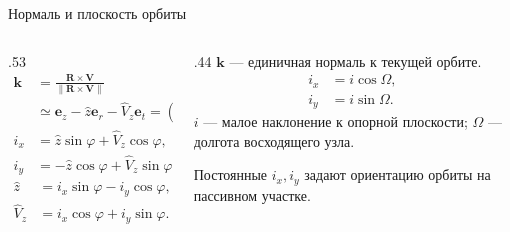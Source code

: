 \documentclass[11pt,aspectratio=169,t]{beamer}
\newcommand{\eqcompact}{\fontsize{10}{12}\selectfont}
\newcommand{\vz}{\widehat V_z}
\newcommand{\zh}{\widehat z}
\begin{document}
\begin{frame}{Нормаль и плоскость орбиты}
\relax
\begin{columns}[T,onlytextwidth]
\begin{column}{.53\textwidth}
{\eqcompact\derivationmathspacing
\[
\begin{aligned}
 \boldsymbol k&=\frac{\boldsymbol R\times\boldsymbol V}
                         {\|\boldsymbol R\times\boldsymbol V\|}\\[4pt]
 &\simeq\boldsymbol e_z-\zh\boldsymbol e_r-\vz\boldsymbol e_t
       =(i_y,-i_x,1),\\[7pt]
 i_x&=\zh\sin\varphi+\vz\cos\varphi,\\[4pt]
 i_y&=-\zh\cos\varphi+\vz\sin\varphi.
\end{aligned}
\]
\[
\boxed{\begin{aligned}
 \zh&=i_x\sin\varphi-i_y\cos\varphi,\\[4pt]
 \vz&=i_x\cos\varphi+i_y\sin\varphi.
\end{aligned}}
\]
}
\end{column}
\begin{column}{.44\textwidth}
\RaggedRight
$\boldsymbol k$ — единичная нормаль к текущей орбите.
{\eqcompact\derivationmathspacing
\[
\begin{aligned}i_x&=i\cos\Omega,\\i_y&=i\sin\Omega.\end{aligned}
\]
}
$i$ — малое наклонение к опорной плоскости; $\Omega$ — долгота восходящего узла.\par\medskip
Постоянные $i_x,i_y$ задают ориентацию орбиты на пассивном участке.
\end{column}
\end{columns}
\end{frame}
\end{document}

